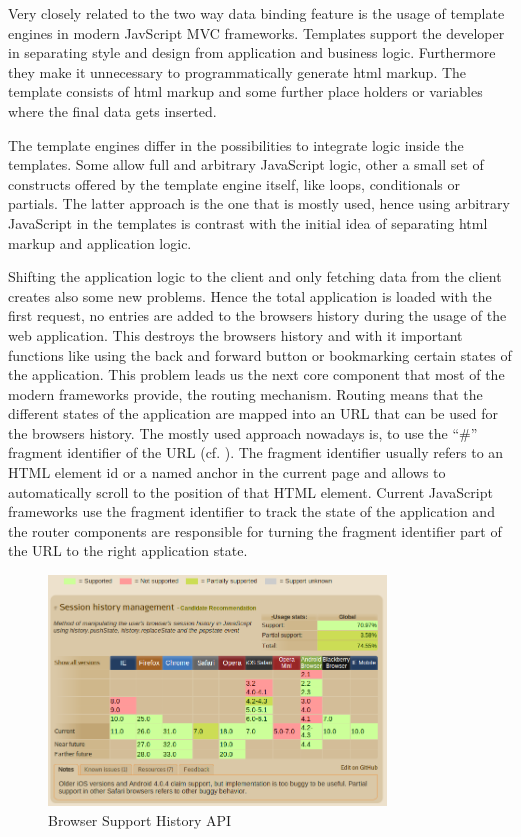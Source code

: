 Very closely related to the two way data binding feature is the usage of template engines in modern JavScript MVC frameworks.
Templates support the developer in separating style and design from application and business logic.
Furthermore they make it unnecessary to programmatically generate html markup.
The template consists of html markup and some further place holders or variables where the final data gets inserted.

The template engines differ in the possibilities to integrate logic inside the templates.
Some allow full and arbitrary JavaScript logic, other a small set of constructs offered by the template engine itself, like loops, conditionals or partials.
The latter approach is the one that is mostly used, hence using arbitrary JavaScript in the templates is contrast with the initial idea of separating html markup and application logic.

Shifting the application logic to the client and only fetching data from the client creates also some new problems.
Hence the total application is loaded with the first request, no entries are added to the browsers history during the usage of the web application.
This destroys the browsers history and with it important functions like using the back and forward button or bookmarking certain states of the application.
This problem leads us the next core component that most of the modern frameworks provide, the routing mechanism.
Routing means that the different states of the application are mapped into an URL that can be used for the browsers history.
The mostly used approach nowadays is, to use the \enquote{\#} fragment identifier of the URL (cf. \autocite{spi_manifesto}).
The fragment identifier usually refers to an HTML element id or a named anchor in the current page and allows to automatically scroll to the position of that HTML element.
Current JavaScript frameworks use the fragment identifier to track the state of the application and the router components are responsible for turning the fragment identifier part of the URL to the right application state.

\begin{figure}
	\centering \includegraphics[width=0.8\textwidth]{./img/web-dev/usage_history_api.png}
	\caption{Browser Support History API \autocite{can_i_use}}
	\label{fig:usage_history_api}
\end{figure}

